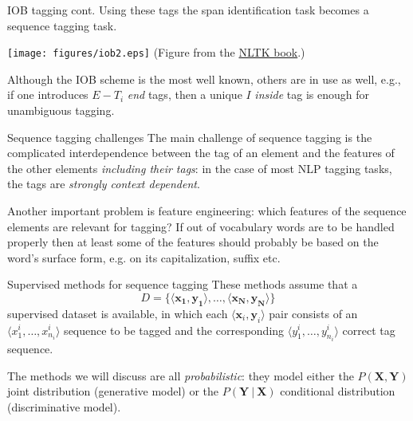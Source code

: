 \documentclass[style=upen, size=14pt]{powerdot}
\newcommand{\gold}{\color{arany}}
\theoremstyle{definition}
\begin{document}
 \begin{slide}[toc=]{IOB tagging cont.}
   Using these tags the span identification task becomes a sequence tagging
   task.
   
   \begin{center}
     \texttt{[image: figures/iob2.eps]}
     \footnotesize(Figure from the \href{http://www.nltk.org/book/ch07.html}{NLTK book}.)
    \end{center}
    
    
    Although the IOB scheme is the most well known, others are in use as well,
    e.g., if one introduces $E-T_i$ \emph{end} tags, then a unique $I$
    \textit{inside} tag is enough for unambiguous tagging.
  \end{slide}

  \begin{slide}[toc=Challenges]{Sequence tagging challenges}
    The main challenge of sequence tagging is the complicated interdependence
    between the tag of an element and the features of the other elements
    \emph{including their tags}: in the case of most NLP tagging tasks, the
    tags are \emph{\gold strongly context dependent}.\bigskip

    Another important problem is feature engineering: which features of the
    sequence elements are relevant for tagging? If out of vocabulary words are
    to be handled properly then at least some of the features should probably be
    based on the word's surface form, e.g. on its capitalization, suffix etc.    
  \end{slide}
  
  \begin{slide}[toc=Supervised methods]{Supervised methods for sequence tagging}
    These methods assume that a
    $$D=\{\langle \mathbf{x_1},\mathbf{y_1} \rangle,\dots, \langle \mathbf{x_N},\mathbf{y_N} \rangle\}$$
    supervised dataset is available, in which each
    $\langle \mathbf{x}_i, \mathbf{y}_i \rangle$ pair consists of an
    $\langle x_1^i,\dots,x_{n_i}^i\rangle$ sequence to be tagged and the
    corresponding $\langle y_1^i,\dots,y_{n_i}^i\rangle$ correct tag sequence.\bigskip

    The methods we will discuss are all \emph{probabilistic}: they model either
    the $ P(\mathbf{X}, \mathbf{Y}) $ joint distribution (generative model) or
    the $ P(\mathbf{Y}~|~\mathbf{X}) $ conditional distribution (discriminative
    model).
  \end{slide}
\end{document}
